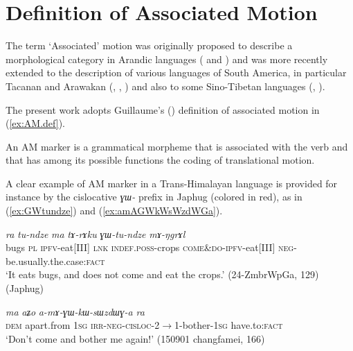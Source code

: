 \documentclass[oneside,a4paper,11pt]{article}
\newcommand{\ipa}[1]{{\phon\textit{#1}}}
\newcommand{\rouge}[1]{{\color{red}#1}}
\begin{document}
\section{Definition of Associated Motion}

The term `Associated' motion was originally proposed to describe a morphological category in Arandic languages (\citealt{koch84associated.motion} and \citealt{wilkins91associated.motion}) and was more recently extended to the description of various languages of South America, in particular Tacanan and Arawakan (\citealt{guillaume09mouv.assoc}, \citealt{rose15am}, \citealt{guillaume16am}) and also to some Sino-Tibetan languages (\citealt{jacques13harmonization}, \citealt{konnerth15cisloc}).

The present work adopts Guillaume's (\citeyear[13]{guillaume16am}) definition of associated motion in (\ref{ex:AM.def}).


\begin{exe}
\ex \label{ex:AM.def}
 \glt An AM marker is a grammatical morpheme that is associated with the verb and that has among its possible functions the coding of translational motion.
\end{exe}

A clear example of AM marker in a Trans-Himalayan language is provided for instance by the cislocative \ipa{ɣɯ-} prefix in Japhug (colored in red), as in (\ref{ex:GWtundze}) and (\ref{ex:amAGWkWsWzdWGa}). 
 
\begin{exe}
\ex \label{ex:GWtundze}
 \gll  \ipa{qajɯ}   \ipa{ra}  \ipa{tu-ndze} \ipa{ma} \ipa{tɤ-rɤku}  \ipa{\rouge{ɣɯ}-tu-ndze} \ipa{mɤ-ŋgrɤl} \\
bugs \textsc{pl} \textsc{ipfv}-eat[III] \textsc{lnk} \textsc{indef}.\textsc{poss}-crops   \textsc{\rouge{come\&do}}-\textsc{ipfv}-eat[III] \textsc{neg}-be.usually.the.case:\textsc{fact} \\
\glt `It eats bugs, and does not \rouge{come and} eat the crops.' (24-ZmbrWpGa, 129) (Japhug)
\end{exe}

\begin{exe}
\ex \label{ex:amAGWkWsWzdWGa}
 \gll     \ipa{nɯ}   \ipa{ma}   \ipa{aʑo}   \ipa{a-mɤ-\rouge{ɣɯ}-kɯ-sɯzdɯɣ-a}   \ipa{ra} \\
 \textsc{dem} apart.from \textsc{1sg} \textsc{irr}-\textsc{neg}-\textsc{\rouge{cisloc}}-2$\rightarrow$1-bother-\textsc{1sg} have.to:\textsc{fact} \\
 \glt `Don't \rouge{come and} bother me again!' (150901 changfamei, 166)
\end{exe}
\end{document}
